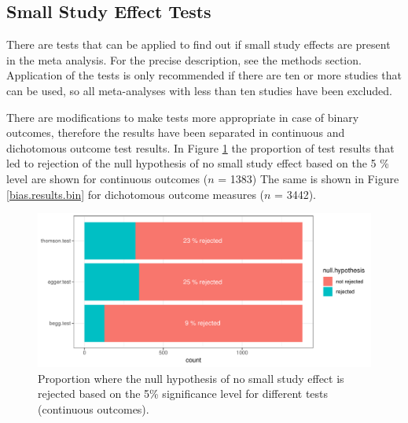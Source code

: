 \documentclass[11pt,a4paper,twoside]{book}\usepackage[]{graphicx}\usepackage[]{color}
\newenvironment{knitrout}{}{} %
\begin{document}
\subsection{Small Study Effect Tests}



There are tests that can be applied to find out if small study effects are present in the meta analysis. For the precise description, see the methods section. Application of the tests is only recommended if there are ten or more studies \citep{cochrane.handbook} that can be used, so all meta-analyses with less than ten studies have been excluded.

\vspace{0mm}
There are modifications to make tests more appropriate in case of binary outcomes, therefore the results have been separated in continuous and dichotomous outcome test results. In Figure \ref{bias.results.cont} the proportion of test results that led to rejection of the null hypothesis of no small study effect based on the 5 \% level are shown for continuous outcomes ($n$ = 1383)
The same is shown in Figure \ref{bias.results.bin} for dichotomous outcome measures ($n$ = 3442).


\begin{figure}
\begin{knitrout}
\color{fgcolor}

{\centering \includegraphics[width=\textwidth-3cm]{figure/ch02_figunnamed-chunk-26-1} 

}



\end{knitrout}
\caption{Proportion where the null hypothesis of no small study effect is rejected based on the 5\% significance level for different tests (continuous outcomes).}
\label{bias.results.cont}
\end{figure}
\end{document}
